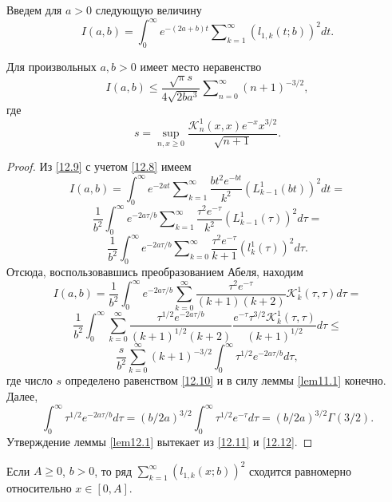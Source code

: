 Введем для $a>0$ следующую величину
\begin{equation}\label{12.9}
I(a,b)=\int_0^\infty e^{-(2a+b)t}\sum\nolimits_{k=1}^\infty({l}_{1,k}(t;b) )^2dt.
\end{equation}
\begin{lemma}\label{lem12.1}
	Для произвольных $a,b>0$ имеет место неравенство
	$$
	I(a,b)\le \frac{\sqrt{\pi}s}{4\sqrt{2ba^3}}\sum\nolimits_{n=0}^\infty(n+1)^{-3/2},
	$$
	где
	\begin{equation}\label{12.10}
	s=\sup_{n,x\ge0}\frac{\mathcal{K}_n^1(x,x)e^{-x}x^{3/2}}{\sqrt{n+1}}.
	\end{equation}
\end{lemma}
\begin{proof}
	Из \eqref{12.9} с учетом \eqref{12.8}   имеем
	$$
	I(a,b)=\int_0^\infty e^{-2at}\sum\nolimits_{k=1}^\infty\frac{bt^2e^{-bt}}{k^2}(L_{k-1}^1(bt))^2dt=
	$$
	$$
	\frac{1}{b^2}\int_0^\infty e^{-2a\tau/b}\sum\nolimits_{k=1}^\infty\frac{\tau^2e^{-\tau}}{k^2}(L_{k-1}^1(\tau))^2d\tau=
	$$
	$$
	\frac{1}{b^2}\int_0^\infty e^{-2a\tau/b}\sum\nolimits_{k=0}^\infty\frac{\tau^2e^{-\tau}}{k+1}(l_k^1(\tau))^2d\tau.
	$$
	Отсюда, воспользовавшись преобразованием Абеля, находим
	$$
	I(a,b)=\frac{1}{b^2}\int_0^\infty e^{-2a\tau/b}\sum_{k=0}^\infty\frac{\tau^2e^{-\tau}}{(k+1)(k+2)}\mathcal{K}_k^1(\tau,\tau)d\tau=
	$$
	$$
	$$
	$$
	\frac{1}{b^2}\int_0^\infty \sum_{k=0}^\infty\frac{\tau^{1/2}e^{-2a\tau/b}}{(k+1)^{1/2}(k+2)}\frac{e^{-\tau}\tau^{3/2} \mathcal{K}_k^1(\tau,\tau)}{(k+1)^{1/2}}d\tau\le
	$$
	\begin{equation}\label{12.11}
	\frac{s}{b^2}\sum_{k=0}^\infty(k+1)^{-3/2}\int_0^\infty
	\tau^{1/2}e^{-2a\tau/b}d\tau,
	\end{equation}
	где число $s$ определено равенством \eqref{12.10} и в силу леммы \ref{lem11.1} конечно.
	Далее,
	\begin{equation}\label{12.12}
	\int_0^\infty\tau^{1/2}e^{-2a\tau/b}d\tau=(b/2a)^{3/2}\int_0^\infty\tau^{1/2}e^{-\tau}d\tau=
	(b/2a)^{3/2}\Gamma(3/2).
	\end{equation}
	Утверждение леммы \ref{lem12.1} вытекает из \eqref{12.11} и \eqref{12.12}.
\end{proof}

\begin{lemma}\label{lem12.2}
	Если $A\ge0$, $b>0$, то ряд
	$\sum_{k=1}^\infty (l_{1,k}(x;b))^2$ сходится равномерно относительно $x\in[0,A]$.
\end{lemma}


